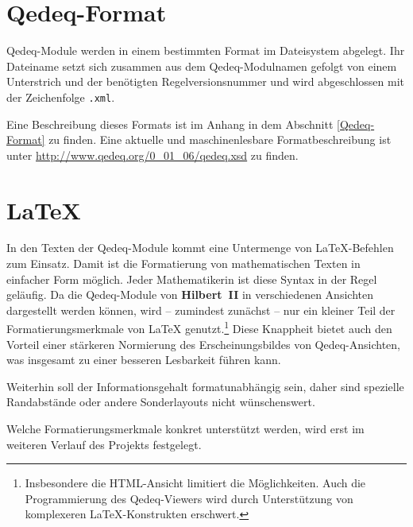 \documentclass[a4paper,german,10pt,twoside]{book}
\begin{document}
{\section{Qedeq-Format}
Qedeq-Module werden in einem bestimmten Format im Dateisystem abgelegt. Ihr Dateiname setzt sich
zusammen aus dem Qedeq-Modulnamen gefolgt von einem Unterstrich und der ben{\"o}tigten
Regelversionsnummer und wird abgeschlossen mit der Zeichenfolge
{\tt .xml}.
\par
Eine Beschreibung dieses Formats ist im Anhang in dem Abschnitt \ref{Qedeq-Format} zu finden. Eine
aktuelle und maschinenlesbare Formatbeschreibung ist unter
\url{http://www.qedeq.org/0_01_06/qedeq.xsd} zu finden.

\section{\LaTeX{}}
In den Texten der Qedeq-Module kommt eine Untermenge von \LaTeX{}-Befehlen zum Einsatz. Damit ist
die Formatierung von mathematischen Texten in einfacher Form m{\"o}glich. Jeder Mathematikerin ist
diese Syntax in der Regel gel{\"a}ufig. Da die Qedeq-Module von \textbf{Hilbert~II} in verschiedenen
Ansichten dargestellt werden k{\"o}nnen, wird -- zumindest zun{\"a}chst -- nur ein kleiner Teil der
Formatierungsmerkmale von \LaTeX{} genutzt.\footnote{Insbesondere die HTML-Ansicht limitiert die
M{\"o}glichkeiten. Auch die Programmierung des Qedeq-Viewers wird durch Unterst{\"u}tzung von komplexeren
\LaTeX{}-Konstrukten erschwert.} Diese Knappheit bietet auch den Vorteil einer st{\"a}rkeren Normierung
des Erscheinungsbildes von Qedeq-Ansichten, was insgesamt zu einer besseren Lesbarkeit f{\"u}hren kann.
\par
Weiterhin soll der Informationsgehalt formatunabh{\"a}ngig sein, daher sind spezielle Randabst{\"a}nde oder
andere Sonderlayouts nicht w{\"u}nschenswert.
\par
Welche Formatierungsmerkmale konkret unterst{\"u}tzt werden, wird erst im weiteren Verlauf des Projekts
festgelegt.

}
\end{document}
